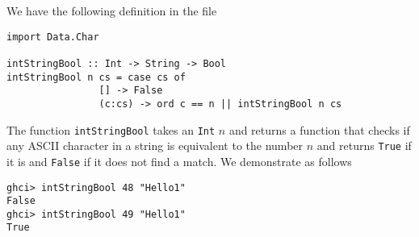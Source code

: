 
We have the following definition in the file 
\scriptsize\begin{verbatim}
import Data.Char

intStringBool :: Int -> String -> Bool
intStringBool n cs = case cs of
                [] -> False
                (c:cs) -> ord c == n || intStringBool n cs
\end{verbatim}\normalsize

The function \verb|intStringBool| takes an \verb|Int| $n$ and returns a function
that checks if any ASCII character in a string is equivalent to the number $n$ and
returns \verb|True| if it is and \verb|False| if it does not find a match. We
demonstrate as follows
\scriptsize\begin{verbatim}
ghci> intStringBool 48 "Hello1"
False
ghci> intStringBool 49 "Hello1"
True
\end{verbatim}\normalsize
